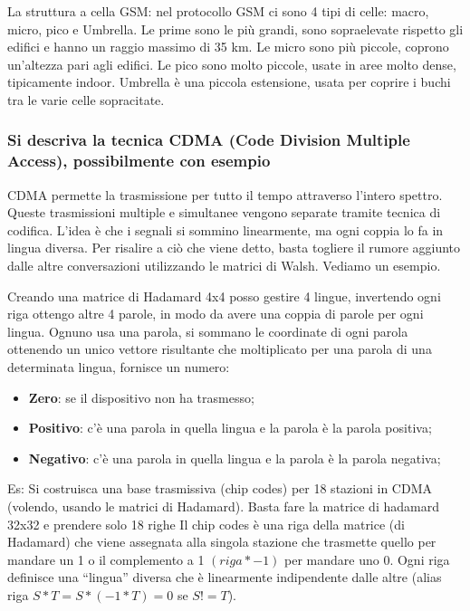 La struttura a cella GSM: nel protocollo GSM ci sono 4 tipi di celle: macro, micro, pico e Umbrella.
Le prime sono le più grandi, sono sopraelevate rispetto gli edifici e hanno un raggio massimo di 35
km. Le micro sono più piccole, coprono un'altezza pari agli edifici. Le pico sono molto piccole, usate
in aree molto dense, tipicamente indoor. Umbrella è una piccola estensione, usata per coprire i
buchi tra le varie celle sopracitate.

\subsubsection{Si descriva la tecnica CDMA (Code Division Multiple Access), possibilmente con esempio}

CDMA permette la trasmissione per tutto il tempo attraverso l'intero spettro. Queste trasmissioni
multiple e simultanee vengono separate tramite tecnica di codifica. L'idea è che i segnali si
sommino linearmente, ma ogni coppia lo fa in lingua diversa. Per risalire a ciò che viene detto,
basta togliere il rumore aggiunto dalle altre conversazioni utilizzando le matrici di Walsh. Vediamo
un esempio.

Creando una matrice di Hadamard 4x4 posso gestire 4 lingue, invertendo ogni riga ottengo altre 4
parole, in modo da avere una coppia di parole per ogni lingua. Ognuno usa una parola, si sommano
le coordinate di ogni parola ottenendo un unico vettore risultante che moltiplicato per una parola
di una determinata lingua, fornisce un numero:

\begin{itemize}

\item \textbf{Zero}: se il dispositivo non ha trasmesso;
\item \textbf{Positivo}: c'è una parola in quella lingua e la parola è la parola positiva;
\item \textbf{Negativo}: c'è una parola in quella lingua e la parola è la parola negativa;

\end{itemize}

Es: Si costruisca una base trasmissiva (chip codes) per 18 stazioni in CDMA (volendo, usando le
matrici di Hadamard).
Basta fare la matrice di hadamard 32x32 e prendere solo 18 righe Il chip codes è una riga della
matrice (di Hadamard) che viene assegnata alla singola stazione che trasmette quello per mandare
un 1 o il complemento a 1 $(riga * -1)$ per mandare uno 0. Ogni riga definisce una ``lingua'' diversa che
è linearmente indipendente dalle altre (alias riga $S*T = S*(-1*T )= 0$ se $S != T$).

